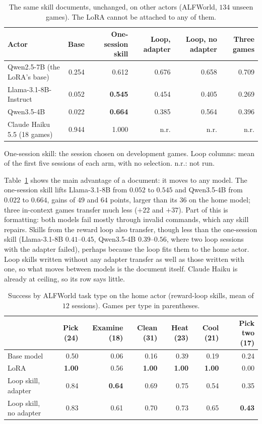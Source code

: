 \documentclass[11pt]{article}
\newcommand{\best}[1]{\textbf{#1}}
\begin{document}
\begin{table}[!htb]
\centering
\caption{The same skill documents, unchanged, on other actors (ALFWorld, $134$ unseen games). The LoRA cannot be attached to any of them.}
\label{tab:axport}
\footnotesize
\setlength{\tabcolsep}{4pt}
\begin{tabular}{lrrrrr}
\toprule
Actor & Base & One-session skill & Loop, adapter & Loop, no adapter & Three games\\
\midrule
Qwen2.5-7B (the LoRA's base) & 0.254 & 0.612 & 0.676 & 0.658 & 0.709\\
Llama-3.1-8B-Instruct & 0.052 & \best{0.545} & 0.454 & 0.405 & 0.269\\
Qwen3.5-4B & 0.022 & \best{0.664} & 0.385 & 0.564 & 0.396\\
Claude Haiku 5.5 (18 games) & 0.944 & 1.000 & n.r. & n.r. & n.r.\\
\bottomrule
\end{tabular}

\smallskip
\begin{minipage}{0.95\linewidth}\footnotesize
One-session skill: the session chosen on development games. Loop columns: mean of the first five sessions of each arm, with no selection.
n.r.: not run.
\end{minipage}
\end{table}

Table~\ref{tab:axport} shows the main advantage of a document: it moves to any model. The one-session skill lifts Llama-3.1-8B from $0.052$ to $0.545$ and
Qwen3.5-4B from $0.022$ to $0.664$, gains of $49$ and $64$ points, larger than its $36$ on the home model; three in-context games transfer much less
($+22$ and $+37$). Part of this is formatting: both models fail mostly through invalid commands, which any skill repairs. Skills from the reward loop also transfer, though less than the one-session skill (Llama-3.1-8B $0.41$--$0.45$, Qwen3.5-4B $0.39$--$0.56$,
where two loop sessions with the adapter failed), perhaps because the loop fits them to the home actor. Loop skills written without any adapter
transfer as well as those written with one, so what moves between models is the document itself. Claude Haiku is
already at ceiling, so its row says little.

\begin{table}[!htb]
\centering
\caption{Success by ALFWorld task type on the home actor (reward-loop skills, mean of $12$ sessions). Games per type in parentheses.}
\label{tab:axtype}
\small
\setlength{\tabcolsep}{4pt}
\begin{tabular}{lrrrrrr}
\toprule
 & Pick (24) & Examine (18) & Clean (31) & Heat (23) & Cool (21) & Pick two (17)\\
\midrule
Base model & 0.50 & 0.06 & 0.16 & 0.39 & 0.19 & 0.24\\
LoRA & \best{1.00} & 0.56 & \best{1.00} & \best{1.00} & \best{1.00} & 0.00\\
Loop skill, adapter & 0.84 & \best{0.64} & 0.69 & 0.75 & 0.54 & 0.35\\
Loop skill, no adapter & 0.83 & 0.61 & 0.70 & 0.73 & 0.65 & \best{0.43}\\
\bottomrule
\end{tabular}
\end{table}
\end{document}
